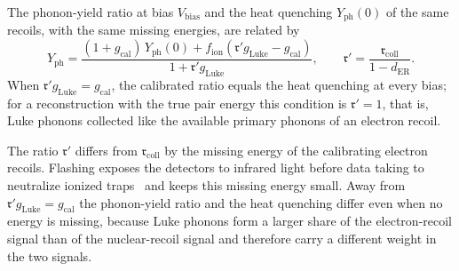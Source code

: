 \begin{keyresult}
The phonon-yield ratio at bias $V_{\mathrm{bias}}$ and the heat quenching $Y_{\mathrm{ph}}(0)$ of the same recoils, with the same missing energies, are related by
\begin{equation}
  Y_{\mathrm{ph}} = \frac{(1 + g_{\mathrm{cal}})\,Y_{\mathrm{ph}}(0) + f_{\mathrm{ion}}(\mathfrak{r}'g_{\mathrm{Luke}} - g_{\mathrm{cal}})}{1 + \mathfrak{r}'g_{\mathrm{Luke}}} , \qquad
  \mathfrak{r}' = \frac{\mathfrak{r}_{\mathrm{coll}}}{1 - d_{\mathrm{ER}}} .
  \label{eq:19.5-calib}
\end{equation}
When $\mathfrak{r}'g_{\mathrm{Luke}} = g_{\mathrm{cal}}$, the calibrated ratio equals the heat quenching at every bias; for a reconstruction with the true pair energy this condition is $\mathfrak{r}' = 1$, that is, Luke phonons collected like the available primary phonons of an electron recoil.
\end{keyresult}
\noindent The ratio $\mathfrak{r}'$ differs from $\mathfrak{r}_{\mathrm{coll}}$ by the missing energy of the calibrating electron recoils. Flashing exposes the detectors to infrared light before data taking to neutralize ionized traps~\cite[Sect.~2]{agnese2018nuclear} and keeps this missing energy small. Away from $\mathfrak{r}'g_{\mathrm{Luke}} = g_{\mathrm{cal}}$ the phonon-yield ratio and the heat quenching differ even when no energy is missing, because Luke phonons form a larger share of the electron-recoil signal than of the nuclear-recoil signal and therefore carry a different weight in the two signals.

